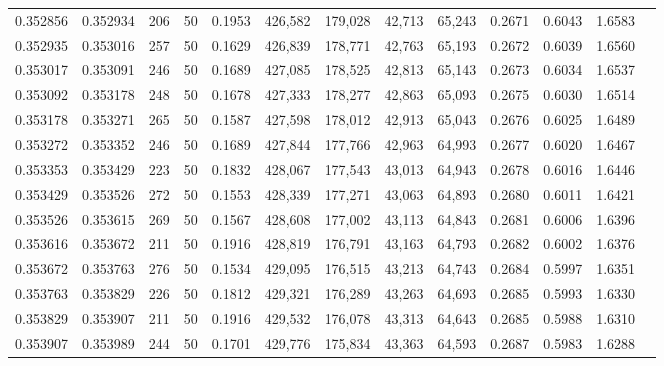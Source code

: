 \begin{tabular}{rrrrrrrrrrrrr}
0.352856 & 0.352934 &   206 &  50 &                                     0.1953 & 426,582 & 179,028 &  42,713 &  65,243 & 0.2671 & 0.6043 & 1.6583 \\
0.352935 & 0.353016 &   257 &  50 &                                     0.1629 & 426,839 & 178,771 &  42,763 &  65,193 & 0.2672 & 0.6039 & 1.6560 \\
0.353017 & 0.353091 &   246 &  50 &                                     0.1689 & 427,085 & 178,525 &  42,813 &  65,143 & 0.2673 & 0.6034 & 1.6537 \\
0.353092 & 0.353178 &   248 &  50 &                                     0.1678 & 427,333 & 178,277 &  42,863 &  65,093 & 0.2675 & 0.6030 & 1.6514 \\
0.353178 & 0.353271 &   265 &  50 &                                     0.1587 & 427,598 & 178,012 &  42,913 &  65,043 & 0.2676 & 0.6025 & 1.6489 \\
0.353272 & 0.353352 &   246 &  50 &                                     0.1689 & 427,844 & 177,766 &  42,963 &  64,993 & 0.2677 & 0.6020 & 1.6467 \\
0.353353 & 0.353429 &   223 &  50 &                                     0.1832 & 428,067 & 177,543 &  43,013 &  64,943 & 0.2678 & 0.6016 & 1.6446 \\
0.353429 & 0.353526 &   272 &  50 &                                     0.1553 & 428,339 & 177,271 &  43,063 &  64,893 & 0.2680 & 0.6011 & 1.6421 \\
0.353526 & 0.353615 &   269 &  50 &                                     0.1567 & 428,608 & 177,002 &  43,113 &  64,843 & 0.2681 & 0.6006 & 1.6396 \\
0.353616 & 0.353672 &   211 &  50 &                                     0.1916 & 428,819 & 176,791 &  43,163 &  64,793 & 0.2682 & 0.6002 & 1.6376 \\
0.353672 & 0.353763 &   276 &  50 &                                     0.1534 & 429,095 & 176,515 &  43,213 &  64,743 & 0.2684 & 0.5997 & 1.6351 \\
0.353763 & 0.353829 &   226 &  50 &                                     0.1812 & 429,321 & 176,289 &  43,263 &  64,693 & 0.2685 & 0.5993 & 1.6330 \\
0.353829 & 0.353907 &   211 &  50 &                                     0.1916 & 429,532 & 176,078 &  43,313 &  64,643 & 0.2685 & 0.5988 & 1.6310 \\
0.353907 & 0.353989 &   244 &  50 &                                     0.1701 & 429,776 & 175,834 &  43,363 &  64,593 & 0.2687 & 0.5983 & 1.6288 \\

\end{tabular}
